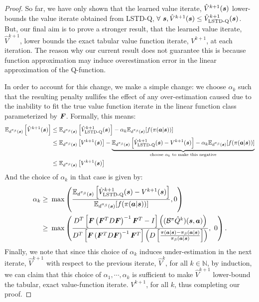 \begin{proof}
So far, we have only shown that the learned value iterate, $\hat{V}^{k+1}(\boldsymbol{s})$ lower-bounds the value iterate obtained from LSTD-Q, $\forall ~\boldsymbol{s}, \hat{V}^{k+1}(\boldsymbol{s}) \leq \hat{V}^{k+1}_{\text{LSTD-Q}}(\boldsymbol{s})$. But, our final aim is to prove a stronger result, that the learned value iterate, $\hat{V}^{k+1}$, lower bounds the exact tabular value function iterate, ${V}^{k+1}$, at each iteration. The reason why our current result does not guarantee this is because function approximation may induce overestimation error in the linear approximation of the Q-function.

In order to account for this change, we make a simple change: we choose $\alpha_k$ such that the resulting penalty nullifes the effect of any over-estimation caused due to the inability to fit the true value function iterate in the linear function class parameterized by $\boldsymbol{F}$. Formally, this means:
\begin{align*}
    \mathbb{E}_{d^{\pi_\beta}(\boldsymbol{s})}\left[\hat{V}^{k+1}(\boldsymbol{s})\right] &\leq \mathbb{E}_{d^{\pi_\beta}(\boldsymbol{s})}\left[\hat{V}^{k+1}_{\text{LSTD-Q}}(\boldsymbol{s})\right] - \alpha_k \mathbb{E}_{d^{\pi_\beta}(\boldsymbol{s})}[f(\pi(\boldsymbol{a}|\boldsymbol{s}))] \\
    & \leq \mathbb{E}_{d^{\pi_\beta}(\boldsymbol{s})}\left[V^{k+1}(\boldsymbol{s})\right] - \underbrace{\mathbb{E}_{d^{\pi_\beta}(\boldsymbol{s})}\left[\hat{V}^{k+1}_{\text{LSTD-Q}}(\boldsymbol{s}) - V^{k+1}(\boldsymbol{s}) \right] - \alpha_k \mathbb{E}_{d^{\pi_\beta}(\boldsymbol{s})}[f(\pi(\boldsymbol{a}|\boldsymbol{s}))]}_{\text{choose~} \alpha_k \text{~to make this negative}} \\
    & \leq \mathbb{E}_{d^{\pi_\beta}(\boldsymbol{s})}\left[V^{k+1}(\boldsymbol{s})\right]
\end{align*}
And the choice of $\alpha_k$ in that case is given by:
\begin{align*}
    \alpha_k \geq& ~ \max \left(\frac{\mathbb{E}_{d^{\pi_\beta}(\boldsymbol{s})}\left[\hat{V}^{k+1}_{\text{LSTD-Q}}(\boldsymbol{s}) - V^{k+1}(\boldsymbol{s}) \right]}{\mathbb{E}_{d^{\pi_\beta}(\boldsymbol{s})}[f(\pi(\boldsymbol{a}|\boldsymbol{s}))]}, 0 \right)\\
    \geq& ~ \max \left(\frac{D^T\left[\boldsymbol{F} \left(\boldsymbol{F}^T D \boldsymbol{F} \right)^{-1} \boldsymbol{F}^T - I \right]\left((\mathcal{B}^\pi \hat{Q}^k)(\boldsymbol{s}, \boldsymbol{a})\right)}{D^T\left[ \boldsymbol{F} \left(\boldsymbol{F}^T D \boldsymbol{F} \right)^{-1} \boldsymbol{F}^T \right] \left(D \left[\frac{\pi(\boldsymbol{a}|\boldsymbol{s}) - {\pi_\beta}(\boldsymbol{a}|\boldsymbol{s})}{{\pi_\beta}(\boldsymbol{a}|\boldsymbol{s})} \right] \right)},~ 0 \right).
\end{align*}
Finally, we note that since this choice of $\alpha_k$ induces under-estimation in the next iterate, $\hat{V}^{k+1}$ with respect to the previous iterate, $\hat{V}^k$, for all $k \in \mathbb{N}$, by induction, we can claim that this choice of $\alpha_1, \cdots, \alpha_k$ is sufficient to make $\hat{V}^{k+1}$ lower-bound the tabular, exact value-function iterate. $V^{k+1}$, for all $k$, thus completing our proof.
\end{proof}

